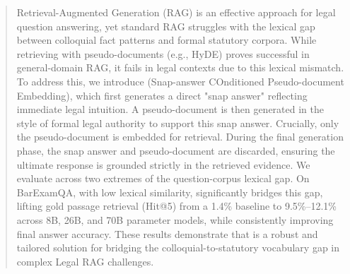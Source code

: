 \begin{abstract}
    Retrieval-Augmented Generation (RAG) is an effective approach for legal question answering, yet standard RAG struggles with the lexical gap between colloquial fact patterns and formal statutory corpora. While retrieving with pseudo-documents (e.g., HyDE) proves successful in general-domain RAG, it fails in legal contexts due to this lexical mismatch. To address this, we introduce \hyre{} (Snap-answer COnditioned Pseudo-document Embedding), which first generates a direct "snap answer" reflecting immediate legal intuition. A pseudo-document is then generated in the style of formal legal authority to support this snap answer. Crucially, only the pseudo-document is embedded for retrieval. During the final generation phase, the snap answer and pseudo-document are discarded, ensuring the ultimate response is grounded strictly in the retrieved evidence. We evaluate \hyre{} across two extremes of the question-corpus lexical gap. On BarExamQA, with low lexical similarity, \hyre{} significantly bridges this gap, lifting gold passage retrieval (Hit@5) from a 1.4\% baseline to 9.5\%–12.1\% across 8B, 26B, and 70B parameter models, while consistently improving final answer accuracy. These results demonstrate that \hyre{} is a robust and tailored solution for bridging the colloquial-to-statutory vocabulary gap in complex Legal RAG challenges.
    \end{abstract}